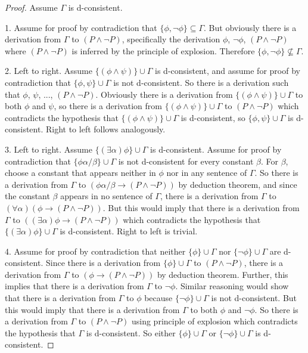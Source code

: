\documentclass[12pt]{article}
\theoremstyle{definition}
\theoremstyle{remark}
\begin{document}
\begin{proof}
	Assume $\Gamma$ is d-consistent.
	
	1. Assume for proof by contradiction that $\{ \phi, \neg\phi \} \subseteq \Gamma$. But obviously there is a derivation from $\Gamma$ to $(P \land \neg P)$, specifically the derivation $\phi$, $\neg\phi$, $(P \land \neg P)$ where $(P \land \neg P)$ is inferred by the principle of explosion. Therefore $\{ \phi, \neg\phi \} \not\subseteq \Gamma$.
	
	2. Left to right. Assume $\{ (\phi \land \psi) \} \cup \Gamma$ is d-consistent, and assume for proof by contradiction that $\{ \phi, \psi \} \cup \Gamma$ is not d-consistent. So there is a derivation such that $\phi$, $\psi$, ..., $(P \land \neg P)$. Obviously there is a derivation from $\{ (\phi \land \psi) \} \cup \Gamma$ to both $\phi$ and $\psi$, so there is a derivation from $\{ (\phi \land \psi) \} \cup \Gamma$ to $(P \land \neg P)$ which contradicts the hypothesis that $\{ (\phi \land \psi) \} \cup \Gamma$ is d-consistent, so $\{ \phi, \psi \} \cup \Gamma$ is d-consistent. Right to left follows analogously. 
	
	3. Left to right. Assume $\{ (\exists \alpha)\phi \} \cup \Gamma$ is d-consistent. Assume for proof by contradiction that $\{ \phi\alpha/\beta \} \cup \Gamma$ is not d-consistent for every constant $\beta$. For $\beta$, choose a constant that appears neither in $\phi$ nor in any sentence of $\Gamma$. So there is a derivation from $\Gamma$ to $(\phi\alpha/\beta \rightarrow (P \land \neg P))$ by deduction theorem, and since the constant $\beta$ appears in no sentence of $\Gamma$, there is a derivation from $\Gamma$ to $(\forall \alpha)(\phi \rightarrow (P \land \neg P))$. But this would imply that there is a derivation from $\Gamma$ to $((\exists \alpha)\phi \rightarrow (P \land \neg P))$ which contradicts the hypothesis that $\{ (\exists \alpha)\phi \} \cup \Gamma$ is d-consistent. Right to left is trivial.
	
	4. Assume for proof by contradiction that neither $\{ \phi \} \cup \Gamma$ nor $\{ \neg\phi \} \cup \Gamma$ are d-consistent. Since there is a derivation from $\{ \phi \} \cup \Gamma$ to $(P \land \neg P)$, there is a derivation from $\Gamma$ to $(\phi \rightarrow (P \land \neg P))$ by deduction theorem. Further, this implies that there is a derivation from $\Gamma$ to $\neg\phi$. Similar reasoning would show that there is a derivation from $\Gamma$ to $\phi$ because $\{ \neg\phi \} \cup \Gamma$ is not d-consistent. But this would imply that there is a derivation from $\Gamma$ to both $\phi$ and $\neg\phi$. So there is a derivation from $\Gamma$ to $(P \land \neg P)$ using principle of explosion which contradicts the hypothesis that $\Gamma$ is d-consistent. So either $\{ \phi \} \cup \Gamma$ or $\{ \neg\phi \} \cup \Gamma$ is d-consistent.
\end{proof}
\end{document}
